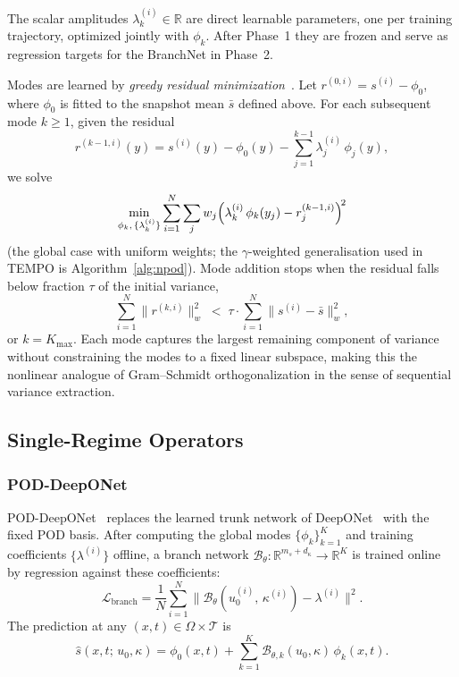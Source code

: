 \documentclass{article}
\begin{document}
The scalar amplitudes $\lambda_k^{(i)} \in \mathbb{R}$ are direct
learnable parameters, one per training trajectory, optimized jointly
with $\phi_k$.
After Phase~1 they are frozen and serve as regression targets for the
BranchNet in Phase~2.

Modes are learned by \emph{greedy residual minimization}~\cite{Mou2026}.
Let $r^{(0,i)} = s^{(i)} - \phi_0$, where $\phi_0$ is fitted to the snapshot mean $\bar{s}$ defined above.
For each subsequent mode $k \ge 1$, given the residual
\begin{equation}
  r^{(k-1,i)}(y)
  = s^{(i)}(y)
  - \phi_0(y)
  - \sum_{j=1}^{k-1}\lambda_j^{(i)}\,\phi_j(y),
  \label{eq:residual_global}
\end{equation}
we solve
\begin{equation}
  \min_{\phi_k,\,\{\lambda_k^{(i)}\}}
  \sum_{i=1}^{N} \sum_j w_j
  \Bigl(\lambda_k^{(i)}\,\phi_k(y_j) - r_j^{(k-1,i)}\Bigr)^{\!2}
  \label{eq:neuralpod_loss}
\end{equation}
(the global case with uniform weights; the $\gamma$-weighted
generalisation used in TEMPO is Algorithm~\ref{alg:npod}).
Mode addition stops when the residual falls below fraction $\tau$ of
the initial variance,
\begin{equation}
  \sum_{i=1}^N \|r^{(k,i)}\|_w^2
  \;<\;
  \tau \cdot \sum_{i=1}^N \|s^{(i)} - \bar{s}\|_w^2,
  \label{eq:npod_tol}
\end{equation}
or $k = K_{\max}$.
Each mode captures the largest remaining component of variance without
constraining the modes to a fixed linear subspace, making this the
nonlinear analogue of Gram--Schmidt orthogonalization in the sense of
sequential variance extraction.

\subsection{Single-Regime Operators}\label{sec:single}


\subsubsection{POD-DeepONet}

POD-DeepONet~\cite{Lu2022} replaces the learned trunk network of
DeepONet~\cite{Lu2019} with the fixed POD basis.
After computing the global modes $\{\phi_k\}_{k=1}^K$ and training
coefficients $\{\lambda^{(i)}\}$ offline, a branch network
$\mathcal{B}_\theta : \mathbb{R}^{m_s + d_\kappa} \to \mathbb{R}^K$
is trained online by regression against these coefficients:
\begin{equation}
  \mathcal{L}_{\mathrm{branch}}
  = \frac{1}{N}\sum_{i=1}^{N}
    \bigl\|\mathcal{B}_\theta(u_0^{(i)},\,\kappa^{(i)})
    - \lambda^{(i)}\bigr\|^2.
  \label{eq:pod_branch_loss}
\end{equation}
The prediction at any $(x,t) \in \Omega \times \mathcal{T}$ is
\begin{equation}
  \hat{s}(x,t;\,u_0,\kappa)
  = \phi_0(x,t)
  + \sum_{k=1}^{K}
    \mathcal{B}_{\theta,k}(u_0,\kappa)\,\phi_k(x,t).
  \label{eq:pod_predict}
\end{equation}
\end{document}
